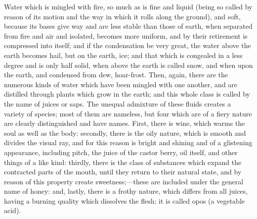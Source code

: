 Water which is mingled with fire, so much as is fine and liquid (being so
called by reason of its motion and the way in which it rolls along the
ground), and soft, because its bases give way and are less stable than
those of earth, when separated from fire and air and isolated, becomes
more uniform, and by their retirement is compressed into itself; and if
the condensation be very great, the water above the earth becomes hail,
but on the earth, ice; and that which is congealed in a less degree and is
only half solid, when above the earth is called snow, and when upon the
earth, and condensed from dew, hoar-frost. Then, again, there are the
numerous kinds of water which have been mingled with one another, and are
distilled through plants which grow in the earth; and this whole class is
called by the name of juices or saps. The unequal admixture of these
fluids creates a variety of species; most of them are nameless, but four
which are of a fiery nature are clearly distinguished and have names.
First, there is wine, which warms the soul as well as the body: secondly,
there is the oily nature, which is smooth and divides the visual ray, and
for this reason is bright and shining and of a glistening appearance,
including pitch, the juice of the castor berry, oil itself, and other
things of a like kind: thirdly, there is the class of substances which
expand the contracted parts of the mouth, until they return to their
natural state, and by reason of this property create sweetness;—these
are included under the general name of honey: and, lastly, there is a
frothy nature, which differs from all juices, having a burning quality
which dissolves the flesh; it is called opos (a vegetable acid).

